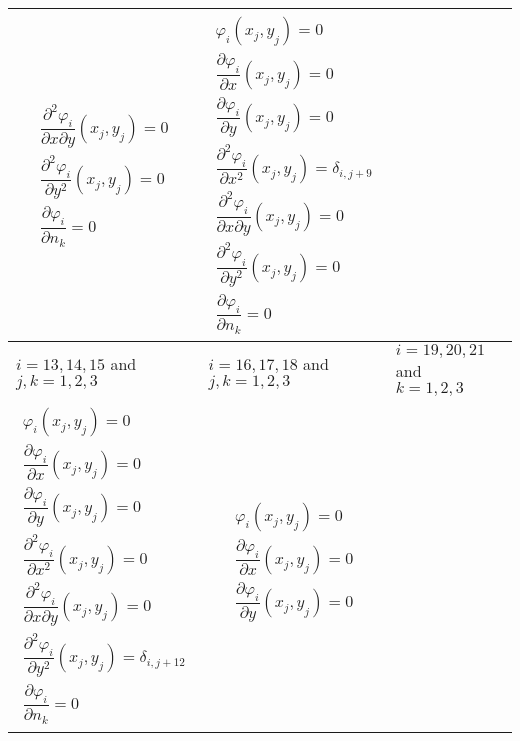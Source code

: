 \begin{sidewaystable}
\begin{center}
{\begin{tabular}{|p{2in}|p{2in}|p{2in}|p{2in}|}
\begin{equation*}
\begin{split}
		\dfrac{\partial^2 \varphi_i}{\partial x \partial y} (x_j,y_j) = 0 \\
		\dfrac{\partial^2 \varphi_i}{\partial y^2} (x_j,y_j) = 0 \\
		\dfrac{\partial\varphi_i}{\partial n_k} = 0
		\end{split}
	\end{equation*} &
	\begin{equation*}
		\begin{split}
		\varphi_i (x_j,y_j) = 0 \\
		\dfrac{\partial \varphi_i}{\partial x} (x_j,y_j) = 0 \\
		\dfrac{\partial \varphi_i}{\partial y} (x_j,y_j) = 0 \\
		\dfrac{\partial^2 \varphi_i}{\partial x^2} (x_j,y_j) = \delta_{i,j+9} \\
		\dfrac{\partial^2 \varphi_i}{\partial x \partial y} (x_j,y_j) = 0 \\
		\dfrac{\partial^2 \varphi_i}{\partial y^2} (x_j,y_j) = 0 \\
		\dfrac{\partial\varphi_i}{\partial n_k} = 0
		\end{split}
	\end{equation*} \\
	\hline
	\hline
	$i=13,14,15$ and $j,k=1,2,3$ &
	$i=16,17,18$ and $j,k=1,2,3$ &
	$i=19,20,21$ and $k=1,2,3$ & \\ \hline
	\begin{equation*}
		\begin{split}
		\varphi_i (x_j,y_j) = 0 \\
		\dfrac{\partial \varphi_i}{\partial x} (x_j,y_j) = 0 \\
		\dfrac{\partial \varphi_i}{\partial y} (x_j,y_j) = 0 \\
		\dfrac{\partial^2 \varphi_i}{\partial x^2} (x_j,y_j) = 0 \\
		\dfrac{\partial^2 \varphi_i}{\partial x \partial y} (x_j,y_j) = 0 \\
		\dfrac{\partial^2 \varphi_i}{\partial y^2} (x_j,y_j) = \delta_{i,j+12} \\
		\dfrac{\partial\varphi_i}{\partial n_k} = 0
		\end{split}
	\end{equation*} &
	\begin{equation*}
		\begin{split}
		\varphi_i (x_j,y_j) = 0 \\
		\dfrac{\partial \varphi_i}{\partial x} (x_j,y_j) = 0 \\
		\dfrac{\partial \varphi_i}{\partial y} (x_j,y_j) = 0 \\

\end{split}
\end{equation*}
\end{tabular}}
\end{center}
\end{sidewaystable}
